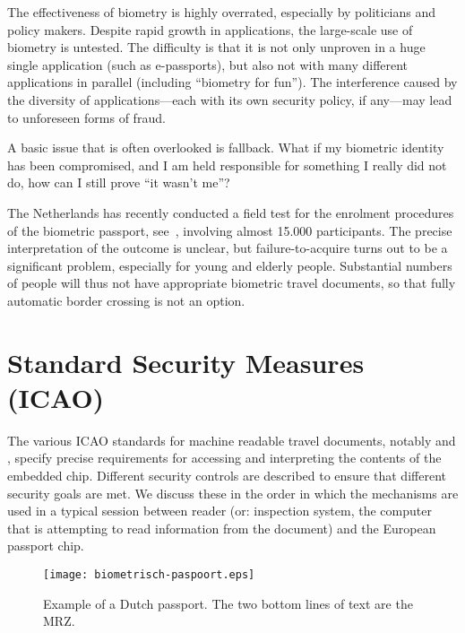 \documentclass[runningheads,envcountsame,envcountsect,oribibl]{llncs}
\begin{document}
The effectiveness of biometry is highly overrated, especially by
politicians and policy makers. Despite rapid growth in applications,
the large-scale use of biometry is untested. The difficulty is that it
is not only unproven in a huge single application (such as
e-passports), but also not with many different applications in
parallel (including ``biometry for fun''). The interference caused by
the diversity of applications---each with its own security policy, if
any---may lead to unforeseen forms of fraud.

A basic issue that is often overlooked is fallback. What if my
biometric identity has been compromised, and I am held responsible for
something I really did not do, how can I still prove ``it wasn't me''?

The Netherlands has recently conducted a field test for the enrolment
procedures of the biometric passport, see~\cite{ToBeOrNotToBe},
involving almost 15.000 participants.  The precise interpretation of
the outcome is unclear, but failure-to-acquire turns out to be a
significant problem, especially for young and elderly
people. Substantial numbers of people will thus not have appropriate
biometric travel documents, so that fully automatic border crossing is
not an option.




\section{Standard Security Measures (ICAO)}
\label{sec-standard}

The various ICAO standards for machine readable travel documents,
notably \cite{icao04:pki} and \cite{icao04:lds}, specify
precise requirements for accessing and interpreting the contents of
the embedded chip. Different security controls are described to ensure that
different security goals are met. We discuss these in the order in which the
mechanisms are used in a typical session between reader
(or: inspection system, the computer that is attempting to read information
from the document) and the European passport chip.

\begin{figure}[t]
\begin{center}
\texttt{[image: biometrisch-paspoort.eps]}
\caption{Example of a Dutch passport. The two bottom lines of text are the
 MRZ.}
\label{fig-example}
\end{center}
\end{figure}
\end{document}
